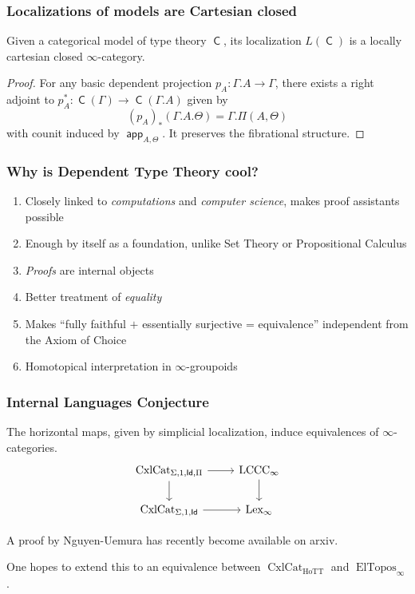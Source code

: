 \documentclass{beamer}
\DeclareMathOperator{\Id}{\mathsf{Id}}
\DeclareMathOperator{\sfC}{\mathsf{C}}
\DeclareMathOperator{\cxl}{CxlCat}
\DeclareMathOperator{\HoTT}{HoTT}
\DeclareMathOperator{\ElTopos}{ElTopos}
\DeclareMathOperator{\lexi}{Lex_\infty}
\DeclareMathOperator{\lccci}{LCCC_\infty}
\DeclareMathOperator{\app}{\mathsf{app}}
\begin{document}
\begin{frame}
  \frametitle{Localizations of models are Cartesian closed}

  \begin{thm}[Kapulkin 2015]
    Given a categorical model of type theory $\sfC$, its localization
    $L(\sfC)$ is a locally cartesian closed $\infty$-category.
  \end{thm}
  \pause

  \begin{proof}
    For any basic dependent projection $p_A\colon\Gamma.A\rightarrow\Gamma$,
    there exists a right adjoint to
    $p_A^*\colon\sfC(\Gamma)\rightarrow\sfC(\Gamma.A)$ given by
    \[(p_A)_*(\Gamma.A.\Theta)=\Gamma.\Pi(A,\Theta)\]
    with counit induced by $\app_{A,\Theta}$. It preserves the fibrational
    structure.
  \end{proof}
\end{frame}

\begin{frame}
\end{frame}

\begin{frame}
  \frametitle{Why is Dependent Type Theory cool?}

  \begin{enumerate}
    \item Closely linked to \emph{computations} and \emph{computer science},
      makes proof assistants possible
    \item Enough by itself as a foundation, unlike Set Theory or Propositional
      Calculus
    \item \emph{Proofs} are internal objects
    \item Better treatment of \emph{equality}
    \item Makes ``fully faithful $+$ essentially surjective = equivalence''
      independent from the Axiom of Choice
    \item Homotopical interpretation in $\infty$-groupoids
  \end{enumerate}
\end{frame}

\begin{frame}
  \frametitle{Internal Languages Conjecture}

  \begin{conj}
    The horizontal maps, given by simplicial localization, induce
    equivalences of $\infty$-categories.
    \[\begin{tikzcd}[ampersand replacement=\&]
      {\cxl_{\Sigma,1,\Id,\Pi}} \& {\lccci} \\
      {\cxl_{\Sigma,1,\Id}} \& {\lexi}
      \arrow[from=1-1, to=2-1]
      \arrow[from=1-2, to=2-2]
      \arrow[from=2-1, to=2-2]
      \arrow[from=1-1, to=1-2]
    \end{tikzcd}\]
  \end{conj}

  A proof by Nguyen-Uemura has recently become available on arxiv.

  One hopes to extend this to an equivalence between $\cxl_{\HoTT}$ and
  $\ElTopos_\infty$.
\end{frame}
\end{document}
